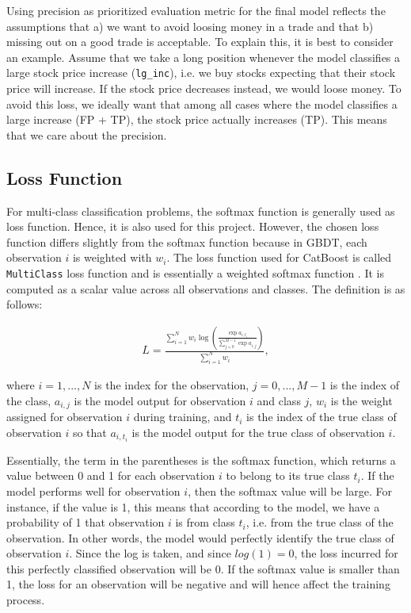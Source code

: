 \documentclass{article}
\begin{document}
	Using precision as prioritized evaluation metric for the final model reflects the assumptions that a) we want to avoid loosing money in a trade and that b) missing out on a good trade is acceptable. To explain this, it is best to consider an example. Assume that we take a long position whenever the model classifies a large stock price increase (\verb|lg_inc|), i.e. we buy stocks expecting that their stock price will increase. If the stock price decreases instead, we would loose money. To avoid this loss, we ideally want that among all cases where the model classifies a large increase (FP + TP), the stock price actually increases (TP). This means that we care about the precision. 
	
	\subsection{Loss Function}
	
	For multi-class classification problems, the softmax function is generally used as loss function. Hence, it is also used for this project. However, the chosen loss function differs slightly from the softmax function because in GBDT, each observation $i$ is weighted with $w_i$. The loss function used for CatBoost is called \lstinline{MultiClass} loss function and is essentially a weighted softmax function \cite{noauthor_multiclassification:_nodate}. It is computed as a scalar value across all observations and classes. The definition is as follows:
	
	\begin{align}
	L = \frac{\sum_{i = 1}^N w_i \log \left(\frac{\exp a_{i, t_i}}{\sum_{j = 0}^{M-1} \exp a_{i, j}}\right)}{\sum_{i = 1}^N w_i}, 
	\end{align}
	
	where $i = 1, ..., N$ is the index for the observation, $j = 0, ..., M-1$ is the index of the class, $a_{i, j}$ is the model output for observation $i$ and class $j$, $w_i$ is the weight assigned for observation $i$ during training, and $t_i$ is the index of the true class of observation $i$ so that $a_{i, t_i}$ is the model output for the true class of observation $i$.
	
	Essentially, the term in the parentheses is the softmax function, which returns a value between 0 and 1 for each observation $i$ to belong to its true class $t_i$. If the model performs well for observation $i$, then the softmax value will be large. For instance, if the value is 1, this means that according to the model, we have a probability of 1 that observation $i$ is from class $t_i$, i.e. from the true class of the observation. In other words, the model would perfectly identify the true class of observation $i$. Since the log is taken, and since $log(1)=0$, the loss incurred for this perfectly classified observation will be 0. If the softmax value is smaller than 1, the loss for an observation will be negative and will hence affect the training process.
	
\end{document}
